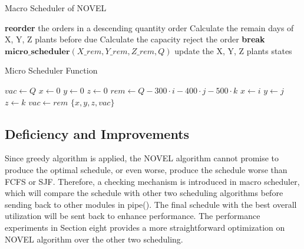 \documentclass[conference]{IEEEtran}
\begin{document}
\begin{algorithm}
\renewcommand{\thealgorithm}{1} %
\caption{Macro Scheduler of NOVEL} %
\begin{algorithmic}[1] %
    \State \textbf{reorder} the orders in a descending quantity order
        \State Calculate the remain days of X, Y, Z plants before due
        \State Calculate the capacity
            \State reject the order
            \State \textbf{break}
        \EndIf
        \State \(\textbf{micro\_scheduler}(X\_rem, Y\_rem, Z\_rem, Q)\)
        \State update the X, Y, Z plants states
    \EndFor
\end{algorithmic}
\end{algorithm}

\begin{algorithm}
\caption{Micro Scheduler Function}
\begin{algorithmic}[1] %
    \State $vac \gets Q$
    \State $x \gets 0$
    \State $y \gets 0$
    \State $z \gets 0$
                \State $rem \gets Q - 300 \cdot i - 400 \cdot j - 500 \cdot k$
                    \State $x \gets i$
                    \State $y \gets j$
                    \State $z \gets k$
                    \State $vac \gets rem$
                \EndIf
            \EndFor
        \EndFor
    \EndFor
    \State \Return $\{x, y, z, vac\}$
\EndFunction
\end{algorithmic}
\end{algorithm}

\subsection{Deficiency and Improvements}
Since greedy algorithm is applied, the NOVEL algorithm cannot promise to produce the optimal schedule, or even worse, produce the schedule worse than FCFS or SJF. Therefore, a checking mechanism is introduced in macro scheduler, which will compare the schedule with other two scheduling algorithms before sending back to other modules in pipe(). The final schedule with the best overall utilization will be sent back to enhance performance. The performance experiments in Section eight provides a more straightforward optimization on NOVEL algorithm over the other two scheduling.
\end{document}
